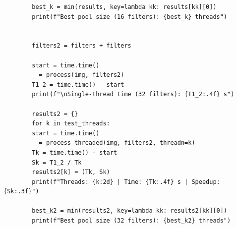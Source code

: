 \documentclass[11pt]{article}
\begin{document}
\begin{verbatim}
		best_k = min(results, key=lambda kk: results[kk][0])
		print(f"Best pool size (16 filters): {best_k} threads")
		
		
		filters2 = filters + filters
		
		start = time.time()
		_ = process(img, filters2)
		T1_2 = time.time() - start
		print(f"\nSingle-thread time (32 filters): {T1_2:.4f} s")
		
		results2 = {}
		for k in test_threads:
		start = time.time()
		_ = process_threaded(img, filters2, threadn=k)
		Tk = time.time() - start
		Sk = T1_2 / Tk
		results2[k] = (Tk, Sk)
		print(f"Threads: {k:2d} | Time: {Tk:.4f} s | Speedup: {Sk:.3f}")
		
		best_k2 = min(results2, key=lambda kk: results2[kk][0])
		print(f"Best pool size (32 filters): {best_k2} threads")
	\end{verbatim}
	
	\newpage
	
\end{document}
